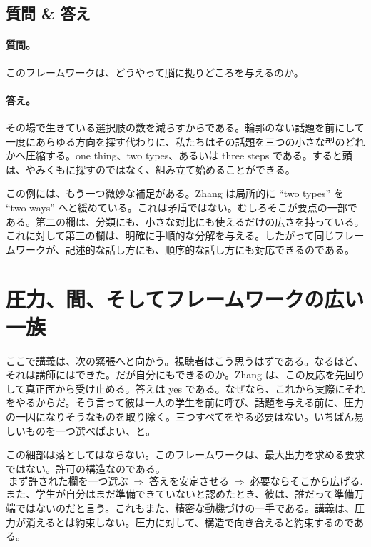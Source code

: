 \subsection{質問 \& 答え}

\paragraph{質問。} このフレームワークは、どうやって脳に拠りどころを与えるのか。

\paragraph{答え。} その場で生きている選択肢の数を減らすからである。輪郭のない話題を前にして一度にあらゆる方向を探す代わりに、私たちはその話題を三つの小さな型のどれかへ圧縮する。one thing、two types、あるいは three steps である。すると頭は、やみくもに探すのではなく、組み立て始めることができる。

この例には、もう一つ微妙な補足がある。Zhang は局所的に ``two types'' を ``two ways'' へと緩めている。これは矛盾ではない。むしろそこが要点の一部である。第二の欄は、分類にも、小さな対比にも使えるだけの広さを持っている。これに対して第三の欄は、明確に手順的な分解を与える。したがって同じフレームワークが、記述的な話し方にも、順序的な話し方にも対応できるのである。

\section{圧力、間、そしてフレームワークの広い一族}

ここで講義は、次の緊張へと向かう。視聴者はこう思うはずである。なるほど、それは講師にはできた。だが自分にもできるのか。Zhang は、この反応を先回りして真正面から受け止める。答えは yes である。なぜなら、これから実際にそれをやるからだ。そう言って彼は一人の学生を前に呼び、話題を与える前に、圧力の一因になりそうなものを取り除く。三つすべてをやる必要はない。いちばん易しいものを一つ選べばよい、と。

この細部は落としてはならない。このフレームワークは、最大出力を求める要求ではない。許可の構造なのである。
\begin{equation}
\text{まず許された欄を一つ選ぶ}
\;\Rightarrow\;
\text{答えを安定させる}
\;\Rightarrow\;
\text{必要ならそこから広げる}.
\end{equation}
また、学生が自分はまだ準備できていないと認めたとき、彼は、誰だって準備万端ではないのだと言う。これもまた、精密な動機づけの一手である。講義は、圧力が消えるとは約束しない。圧力に対して、構造で向き合えると約束するのである。

